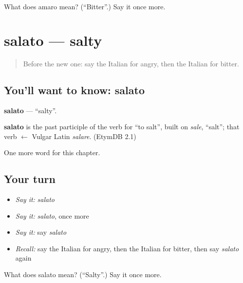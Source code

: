 \begin{tcolorbox}[breakable,colback=teal!4,colframe=teal!35!black,title={Before you move on}]
What does amaro mean? (\textquotedblleft{}Bitter\textquotedblright{}.) Say it once more.
\end{tcolorbox}
\section[salato]{salato — salty}

\label{lesson:IT-C130-salato}



\begin{quote}
Before the new one: say the Italian for angry, then the Italian for bitter.
\end{quote}

\subsection*{You'll want to know: salato}
\textbf{salato} — \textquotedblleft{}salty\textquotedblright{}.

\begin{cousinweb}
\textbf{salato} is the past participle of the verb for \textquotedblleft{}to salt\textquotedblright{}, built on \emph{sale}, \textquotedblleft{}salt\textquotedblright{}; that verb $\leftarrow$ Vulgar Latin \emph{salare}. (EtymDB 2.1)
\end{cousinweb}

\begin{grammarlens}[title={What you've built}]
One more word for this chapter.
\end{grammarlens}

\subsection*{Your turn}
\begin{itemize}
\raggedright
  \item \emph{Say it:} \emph{salato}
  \item \emph{Say it:} \emph{salato}, once more
  \item \emph{Say it:} say \emph{salato}
  \item \emph{Recall:} say the Italian for angry, then the Italian for bitter, then say \emph{salato} again
\end{itemize}

\begin{tcolorbox}[breakable,colback=teal!4,colframe=teal!35!black,title={Before you move on}]
What does salato mean? (\textquotedblleft{}Salty\textquotedblright{}.) Say it once more.
\end{tcolorbox}
